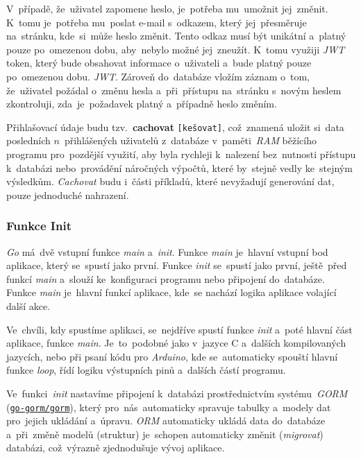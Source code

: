 \documentclass[10pt,a4paper]{article}
\begin{document}
            V~případě, že~uživatel zapomene heslo, je~potřeba mu~umožnit jej~změnit. K~tomu je~potřeba mu~poslat e-mail s~odkazem, který jej~přesměruje na~stránku, kde~si~může heslo změnit. Tento odkaz musí být unikátní a~platný pouze po~omezenou dobu, aby~nebylo možné jej~zneužít. K~tomu využiji \emph{JWT} token, který bude obsahovat informace o~uživateli a~bude platný pouze po~omezenou dobu. \emph{JWT}. Zároveň do~databáze vložím záznam o~tom, že~uživatel požádal o~změnu hesla a~při~přístupu na~stránku s~novým heslem zkontroluji, zda~je~požadavek platný a~případně heslo změním.

            Přihlašovací údaje budu tzv.~\textbf{cachovat} \texttt{[kešovat]}, což~znamená uložit si~data posledních $n$~přihlášených uživatelů z~databáze v~paměti~\emph{RAM} běžícího programu pro~pozdější využití, aby byla rychleji k~nalezení bez~nutnosti přístupu k~databázi nebo~provádění náročných výpočtů, které by~stejně vedly ke~stejným výsledkům. \emph{Cachovat} budu i~části příkladů, které nevyžadují generování dat, pouze jednoduché nahrazení.
            
        \subsubsection{Funkce Init}
            \emph{Go} má~dvě vstupní funkce \emph{main} a~\emph{init}. Funkce \emph{main} je~hlavní vstupní bod aplikace, který se~spustí jako první. Funkce \emph{init} se~spustí jako první, ještě~před funkcí \emph{main} a~slouží ke~konfiguraci programu nebo připojení do~databáze. Funkce \emph{main} je~hlavní funkcí aplikace, kde~se nachází logika aplikace volající další akce.

            Ve~chvíli, kdy spustíme aplikaci, se~nejdříve spustí funkce \emph{init} a~poté hlavní část aplikace, funkce \emph{main}. Je~to~podobné jako v~jazyce C a~dalších kompilovaných jazycích, nebo při psaní kódu pro \emph{Arduino}, kde se~automaticky spouští hlavní funkce \emph{loop}, řídí logiku výstupních pinů a~dalších částí programu.
            
            Ve~funkci~\emph{init} nastavíme připojení k~databázi prostřednictvím systému~\emph{GORM} (\href{https://gorm.io/}{\texttt{go-gorm/gorm}}), který pro~nás~automaticky spravuje tabulky a~modely dat pro~jejich ukládání a~úpravu. \emph{ORM} automaticky ukládá data do~databáze a~při~změně modelů (struktur) je~schopen automaticky změnit (\emph{migrovat}) databázi, což~výrazně zjednodušuje vývoj aplikace.
\end{document}

